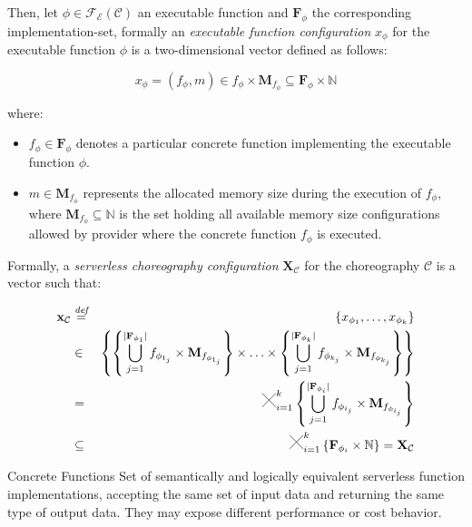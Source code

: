 \documentclass[13.5pt]{beamer}
\newcommand{\Cross}{\mathbin{\tikz [x=2.5ex,y=2.5ex,line width=.10ex] \draw (0,0) -- (1,1) (0,1) -- (1,0);}}
\newcommand{\mathDef}{\overset{\textit{def}}{=}}
\newcommand{\N}{\mathbb{N}}
\begin{document}
\begin{frame}
	Then, let $\phi \in \mathscr{F_E}(\mathcal{C})$ an executable function and $\textbf{F}_{\phi}$ the corresponding implementation-set, formally an \textit{executable function configuration} $x_{\phi}$ for the executable function $\phi$ is a two-dimensional vector defined as follows:
	
	\begin{equation}
		x_{\phi} = (f_{\phi},m) \in f_{\phi} \times \textbf{M}_{f_{\phi}} \subseteq \textbf{F}_{\phi} \times \N
	\end{equation}
	
	where:
	
	\begin{itemize}
		\item $f_{\phi} \in \textbf{F}_{\phi}$  denotes a particular concrete function implementing the executable function $\phi$.
		\item $m \in \textbf{M}_{f_{\phi}}$ represents the allocated memory size during the execution of $f_{\phi}$, where $\textbf{M}_{f_{\phi}} \subseteq \N$ is the set holding all available memory size configurations allowed by provider where the concrete function $f_{\phi}$ is executed.
	\end{itemize}
\end{frame}


\begin{frame}
	Formally, a \textit{serverless choreography configuration} $\textbf{X}_{\mathcal{C}}$ for the choreography $\mathcal{C}$ is a vector such that:
	
	\begin{eqnarray}
		\textbf{x}_{\mathcal{C}} & \mathDef & \left\lbrace x_{\phi_{1}}, \ldots, x_{\phi_{k}} \right\rbrace \nonumber \\ 
		& \in & \left\{  \left\{ \bigcup_{j=1}^{|\textbf{F}_{\phi_{1}}|} f_{\phi_{1_j}} \times \textbf{M}_{f_{\phi_{1_j}}} \right\} \times \ldots \times \left\{ \bigcup_{j=1}^{|\textbf{F}_{\phi_{k}}|} f_{\phi_{k_j}} \times \textbf{M}_{f_{\phi_{k_j}}} \right\} \right\}  \nonumber \\
		& = & \Cross_{i = 1}^k \left\{ \bigcup_{j=1}^{|\textbf{F}_{\phi_{i}}|} f_{\phi_{i_j}} \times \textbf{M}_{f_{\phi_{i_j}}} \right\} \nonumber \\
		& \subseteq & \Cross_{i = 1}^k \left\{ \textbf{F}_{\phi_{i}} \times \mathbb{N} \right\} = \textbf{X}_{\mathcal{C}}
	\end{eqnarray}

	\begin{block}{Concrete Functions}
		\centering
		Set of semantically and logically equivalent serverless function implementations, accepting the same set of input data and returning the same type of output data. They may expose different performance or cost behavior.
	\end{block}

\end{frame}
\end{document}
